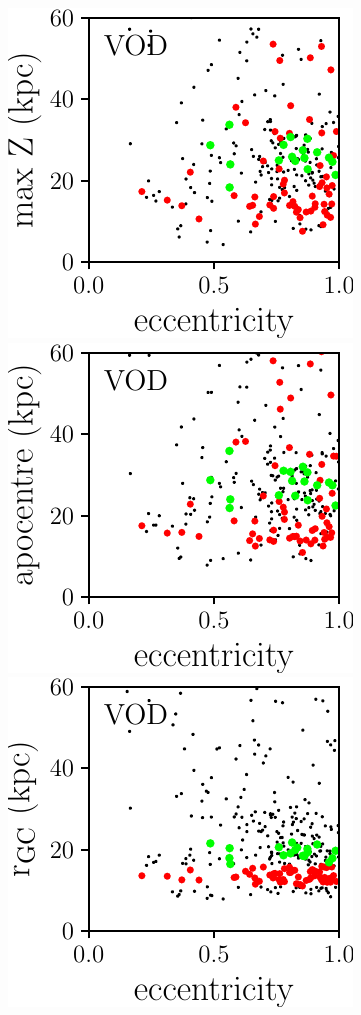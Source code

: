 \documentclass[fleqn,usenatbib]{mnras}
\begin{document}
\begin{figure}
	\includegraphics[scale=0.473]{VOD_orbits_ecc_z.pdf}
    \includegraphics[scale=0.473]{VOD_orbits_apo_ecc.pdf} 
  \includegraphics[scale=0.473]{VOD_orbits_ecc_r.pdf} 

\end{figure}
\end{document}
